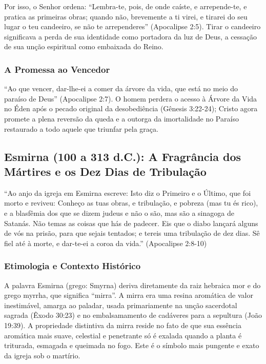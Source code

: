 \documentclass[11pt,a4paper,openany]{book}
\begin{document}
Por isso, o Senhor ordena: ``Lembra-te, pois, de onde caíste, e arrepende-te, e pratica as primeiras obras; quando não, brevemente a ti virei, e tirarei do seu lugar o teu candeeiro, se não te arrependeres'' (Apocalipse 2:5). Tirar o candeeiro significava a perda de sua identidade como portadora da luz de Deus, a cessação de sua unção espiritual como embaixada do Reino.


\subsubsection*{A Promessa ao Vencedor}
``Ao que vencer, dar-lhe-ei a comer da árvore da vida, que está no meio do paraíso de Deus'' (Apocalipse 2:7). O homem perdera o acesso à Árvore da Vida no Éden após o pecado original da desobediência (Gênesis 3:22-24); Cristo agora promete a plena reversão da queda e a outorga da imortalidade no Paraíso restaurado a todo aquele que triunfar pela graça.



\subsection{Esmirna (100 a 313 d.C.): A Fragrância dos Mártires e os Dez Dias de Tribulação}


``Ao anjo da igreja em Esmirna escreve: Isto diz o Primeiro e o Último, que foi morto e reviveu: Conheço as tuas obras, e tribulação, e pobreza (mas tu és rico), e a blasfêmia dos que se dizem judeus e não o são, mas são a sinagoga de Satanás. Não temas as coisas que hás de padecer. Eis que o diabo lançará alguns de vós na prisão, para que sejais tentados; e tereis uma tribulação de dez dias. Sê fiel até à morte, e dar-te-ei a coroa da vida.'' (Apocalipse 2:8-10)


\subsubsection*{Etimologia e Contexto Histórico}
A palavra Esmirna (grego: Smyrna) deriva diretamente da raiz hebraica mor e do grego myrrha, que significa ``mirra''. A mirra era uma resina aromática de valor inestimável, amarga ao paladar, usada primariamente na unção sacerdotal sagrada (Êxodo 30:23) e no embalsamamento de cadáveres para a sepultura (João 19:39). A propriedade distintiva da mirra reside no fato de que sua essência aromática mais suave, celestial e penetrante só é exalada quando a planta é triturada, esmagada e queimada no fogo. Este é o símbolo mais pungente e exato da igreja sob o martírio.
\end{document}
